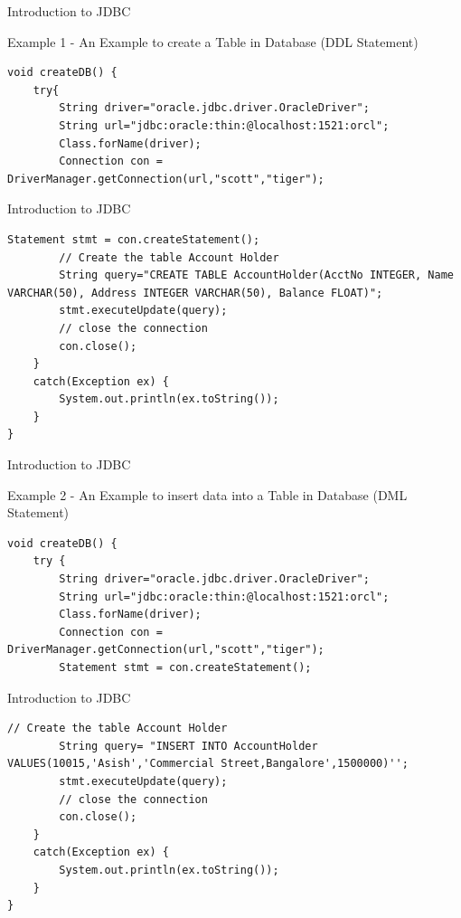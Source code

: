 \documentclass[14pt]{beamer}
\begin{document}
\begin{frame}[fragile]{Introduction to JDBC}
\begin{block}{}
Example 1 -  An Example to create a Table in Database (DDL Statement)
\end{block}
\begin{lstlisting}[numbers=none]
void createDB() {
    try{
        String driver="oracle.jdbc.driver.OracleDriver";
        String url="jdbc:oracle:thin:@localhost:1521:orcl";
        Class.forName(driver);
        Connection con = DriverManager.getConnection(url,"scott","tiger");
\end{lstlisting}
\end{frame}
\begin{frame}[fragile]{Introduction to JDBC}
\begin{lstlisting}[numbers=none]
        Statement stmt = con.createStatement();
        // Create the table Account Holder
        String query="CREATE TABLE AccountHolder(AcctNo INTEGER, Name VARCHAR(50), Address INTEGER VARCHAR(50), Balance FLOAT)";
        stmt.executeUpdate(query);
        // close the connection
        con.close();
    }
    catch(Exception ex) {
        System.out.println(ex.toString());
    }
}
\end{lstlisting}
\end{frame}

\begin{frame}[fragile]{Introduction to JDBC}
\begin{block}{}
Example 2 -  An Example to insert data into  a Table in Database (DML Statement)
\end{block}
\begin{lstlisting}[numbers=none]
void createDB() {
    try {
        String driver="oracle.jdbc.driver.OracleDriver";
        String url="jdbc:oracle:thin:@localhost:1521:orcl";
        Class.forName(driver);
        Connection con = DriverManager.getConnection(url,"scott","tiger");
        Statement stmt = con.createStatement();
\end{lstlisting}
\end{frame}
\begin{frame}[fragile]{Introduction to JDBC}
\begin{lstlisting}[numbers=none]
        // Create the table Account Holder
        String query= "INSERT INTO AccountHolder VALUES(10015,'Asish','Commercial Street,Bangalore',1500000)'';
        stmt.executeUpdate(query);
        // close the connection
        con.close();
    }
    catch(Exception ex) {
        System.out.println(ex.toString());
    }
}
\end{lstlisting}
\end{frame}
\end{document}
